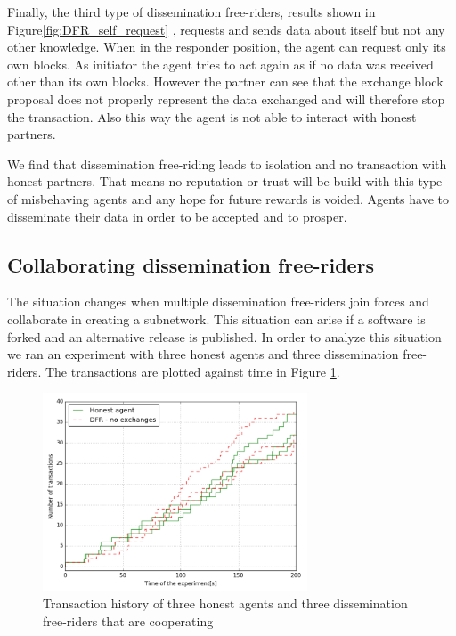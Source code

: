 Finally, the third type of dissemination free-riders, results shown in Figure\ref{fig:DFR_self_request}
, requests and sends data about itself but not any other knowledge. When in the responder position, 
the agent can request only its own blocks. As initiator the agent tries to act again as if no data
was received other than its own blocks. However the partner can see that the exchange block proposal
does not properly represent the data exchanged and will therefore stop the transaction. Also this way
the agent is not able to interact with honest partners. 

We find that dissemination free-riding leads to isolation and no transaction with honest partners. 
That means no reputation or trust will be build with this type of misbehaving agents and any hope for
future rewards is voided. Agents have to disseminate their data in order to be accepted and to prosper.

\subsection{Collaborating dissemination free-riders}
The situation changes when multiple dissemination free-riders join forces and collaborate in creating
a subnetwork. This situation can arise if a software is forked and an alternative release is published.
 In order to analyze this situation we ran an experiment 
with three honest agents and three dissemination free-riders. The transactions are plotted against 
time in Figure \ref{fig:50percent}.

\begin{figure}[h!]
    \centering
    \includegraphics[width=0.7\textwidth]{images/50percent}
    \caption{Transaction history of three honest agents and three dissemination free-riders
    that are cooperating}
    \label{fig:50percent}
\end{figure}

